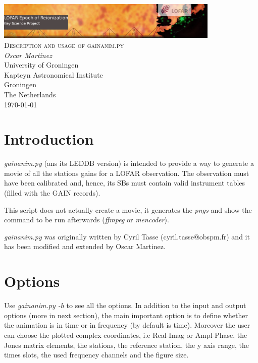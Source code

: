 \documentclass[a4paper,11pt]{article}
\begin{document}
\begin{titlepage}
\begin{center}
\includegraphics[width=0.8\textwidth]{fig/eorlogo}\\[3cm]    
\textsc{\LARGE Description and usage of gainanim.py}\\[0.5cm]
\vfill
{\large 
\emph{Oscar Martinez} \\
University of Groningen \\ 
Kapteyn Astronomical Institute \\
Groningen \\
The Netherlands \\
\today}
\end{center}
\end{titlepage}

\tableofcontents
\newpage

\section {Introduction}

\textit{gainanim.py} (ans its LEDDB version) is intended to provide a way to generate a movie of all the stations gains for a LOFAR observation. The observation must have been calibrated and, hence, its SBs must contain valid instrument tables (filled with the GAIN records).

This script does not actually create a movie, it generates the \textit{pngs} and show the command to be run afterwards (\textit{ffmpeg} or \textit{mencoder}). 

\textit{gainanim.py} was originally written by Cyril Tasse (cyril.tasse@obspm.fr) and it has been modified and extended by Oscar Martinez.

\section {Options}

Use \textit{gainanim.py -h} to see all the options. In addition to the input and output options (more in next section), the main important option is to define whether the animation is in time or in frequency (by default is time). Moreover the user can choose the plotted complex coordinates, i.e Real-Imag or Ampl-Phase, the Jones matrix elements, the stations, the reference station, the y axis range, the times slots, the used frequency channels and the figure size.
\end{document}
